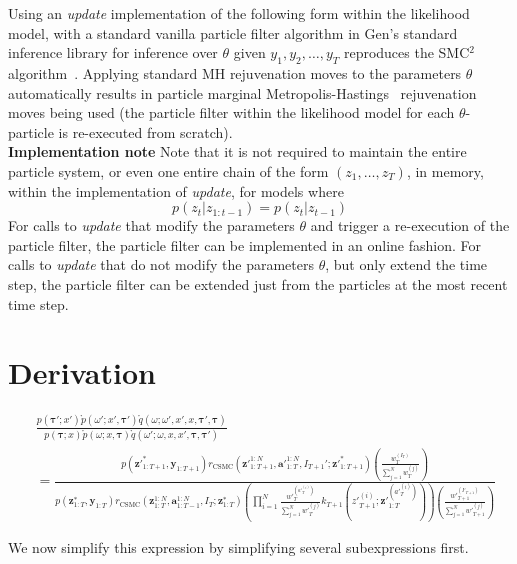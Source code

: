 \documentclass[11pt]{article}
\newcommand{\z}{\mathbf{z}}
\newcommand{\abold}{\mathbf{a}}
\newcommand{\y}{\mathbf{y}}
\newcommand\tdict[0]{\boldsymbol{\tau}}
\begin{document}
Using an \emph{update} implementation of the following form within the likelihood model, with a standard vanilla particle filter algorithm in Gen's standard inference library for inference over $\theta$ given $y_1, y_2, \ldots, y_T$ reproduces the SMC$^2$ algorithm~\citep{chopin2013smc2}.
Applying standard MH rejuvenation moves to the parameters $\theta$ automatically results in particle marginal Metropolis-Hastings~\citep{andrieu2010particle} rejuvenation moves being used (the particle filter within the likelihood model for each $\theta$-particle is re-executed from scratch).\\

\noindent \textbf{Implementation note}
Note that it is not required to maintain the entire particle system, or even one entire chain of the form $(z_1, \ldots, z_T)$, in memory, within the implementation of \emph{update}, for models where
\[
p(z_t | z_{1:t-1}) = p(z_t | z_{t-1})
\]
For calls to \emph{update} that modify the parameters $\theta$ and trigger a re-execution of the particle filter,
the particle filter can be implemented in an online fashion.
For calls to \emph{update} that do not modify the parameters $\theta$, but only extend the time step,
the particle filter can be extended just from the particles at the most recent time step.

 

\appendix
\section{Derivation}
\begin{align*}
& \frac{p(\tdict'; x') \mathring{p}(\omega'; x', \tdict')\mathring{q}(\omega; \omega', x', x, \tdict', \tdict)}
{p(\tdict; x) \mathring{p}(\omega; x, \tdict) \mathring{q}(\omega'; \omega, x, x', \tdict, \tdict')}\\
&= \frac{
    p({\z'}_{1:T+1}^*, \y_{1:T+1})
    r_{\mathrm{CSMC}}({\z'}_{1:T+1}^{1:N}, {\abold'}_{1:T}^{1:N}, I_{T+1}'; {\z'}_{1:T+1}^*)
    \left( \frac{{w}_{T}^{(I_{T})}}{\sum_{j=1}^N {w}_{T}^{(j)}} \right)
}{
    p(\z_{1:T}^*, \y_{1:T})
    r_{\mathrm{CSMC}}(\z_{1:T}^{1:N}, \abold_{1:T-1}^{1:N}, I_T; \z_{1:T}^*)
    \left( \prod_{i=1}^N \frac{{w'}_{T}^{({a'}_{T}^{(i)})}}{\sum_{j=1}^N {w'}_{T}^{(j)}} k_{T+1}({z'}_{T+1}^{(i)}; {\z'}_{1:T}^{({a'}_{T}^{(i)})} ) \right)
    \left( \frac{{w'}_{T+1}^{(I'_{T+1})}}{\sum_{j=1}^N {w'}_{T+1}^{(j)}} \right)
}
\end{align*}

We now simplify this expression by simplifying several subexpressions first.
\end{document}
